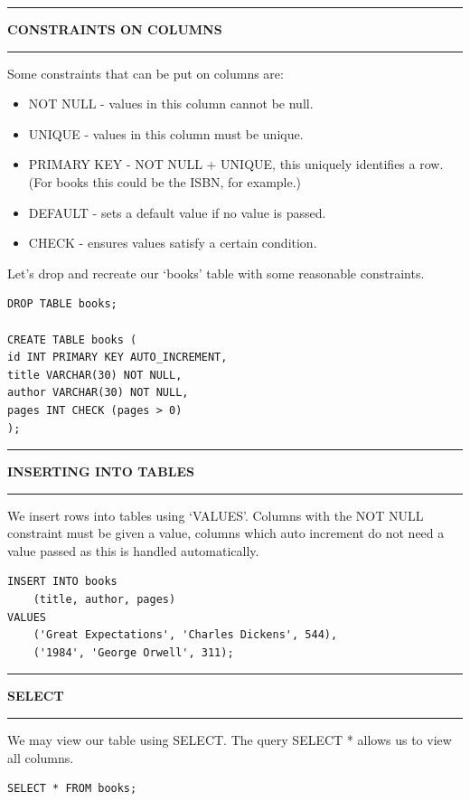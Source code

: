 \documentclass[8pt]{extarticle}
\newcommand{\heading}[1]{%
    \noindent
    \rule{\linewidth}{0.4pt}
    \begin{center}
        \vspace{-1ex}
        \textbf{#1}        
        \vspace{-2.5ex}
    \end{center}
    \rule{\linewidth}{0.4pt}
}
\begin{document}
\begin{multicols}{4}
\vspace*{1.5ex}

\heading{CONSTRAINTS ON COLUMNS}

Some constraints that can be put on columns are:
\begin{itemize}[leftmargin=*]
    \item NOT NULL - values in this column cannot be null.
    \item UNIQUE - values in this column must be unique.
    \item PRIMARY KEY - NOT NULL + UNIQUE, this uniquely identifies a row. (For books this could be the ISBN, for example.)
    \item DEFAULT - sets a default value if no value is passed.
    \item CHECK - ensures values satisfy a certain condition.
\end{itemize}

Let's drop and recreate our `books' table with some reasonable constraints.

\vspace{0.5ex}
\begin{lstlisting}[style=sql]
DROP TABLE books;

CREATE TABLE books (
id INT PRIMARY KEY AUTO_INCREMENT,
title VARCHAR(30) NOT NULL,
author VARCHAR(30) NOT NULL,
pages INT CHECK (pages > 0) 
);
\end{lstlisting}

\vspace{1ex}

\heading{INSERTING INTO TABLES}

We insert rows into tables using `VALUES'. Columns with the NOT NULL constraint must be given a value, columns which auto increment do not need a value passed as this is handled automatically. 

\vspace{0.5ex}
\begin{lstlisting}[style=sql]
INSERT INTO books 
    (title, author, pages)
VALUES 
    ('Great Expectations', 'Charles Dickens', 544),
    ('1984', 'George Orwell', 311);
\end{lstlisting}
\vspace{0.5ex}

\vspace{1ex}

\heading{SELECT}

We may view our table using SELECT. The query SELECT * allows us to view all columns.

\vspace{0.5ex}
\begin{lstlisting}[style=sql]
SELECT * FROM books;
\end{lstlisting}
\vspace{0.5ex}


\end{multicols}
\end{document}
